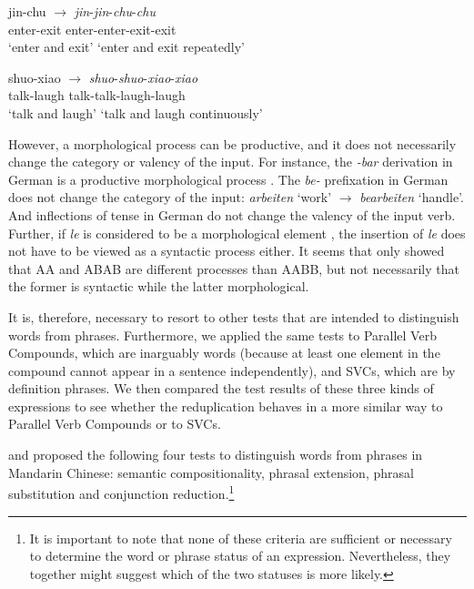   \ex \gll jin-chu $\rightarrow$ \textit{jin}-\textit{jin}-\textit{chu}-\textit{chu}\\
  enter-exit {} enter-enter-exit-exit\\ 
  \glt `enter and exit' `enter and exit repeatedly'
  
  \ex \gll shuo-xiao $\rightarrow$ \textit{shuo}-\textit{shuo}-\textit{xiao}-\textit{xiao}\\
  talk-laugh {} talk-talk-laugh-laugh\\ 
  \glt `talk and laugh' `talk and laugh continuously'
  \z
\z

However, a morphological process can be productive, and it does not necessarily change the category or valency of the input.
For instance, the \textit{-bar} derivation in German is a productive morphological process \citep[381]{Mueller2013}. 
The \textit{be-} prefixation in German does not change the category of the input: \textit{arbeiten} `work' $\rightarrow$ \textit{bearbeiten} `handle'. 
And inflections of tense in German do not change the valency of the input verb.
Further, if \textit{le} is considered to be a morphological element \citep[e.g.][]{Huangetal2009, MuellerLipenkova2013}, the insertion of \textit{le} does not have to be viewed as a syntactic
process either.
It seems that \citet{Xie2020} only showed that AA and ABAB are different processes than AABB, but not necessarily that the former is syntactic while the latter morphological.

It is, therefore, necessary to resort to other tests that are intended to distinguish words from phrases. 
Furthermore, we applied the same tests to Parallel Verb Compounds, which are inarguably words (because at least one element in the compound cannot appear in a sentence independently), 
and {SVC}s, which are by definition phrases. 
We then compared the test results of these three kinds of expressions to see whether the reduplication behaves in a more similar way to Parallel Verb Compounds or to {SVC}s.



\citet{Duanmu1998} and \citet{Schaefer2009} proposed the following four tests to
distinguish words from phrases in Mandarin Chinese: semantic compositionality, phrasal extension,
phrasal substitution and conjunction reduction.\footnote{It is important to note that none of these criteria are sufficient or necessary to determine the word or phrase status of an expression. Nevertheless, they together might suggest which of the two statuses is more likely.}

